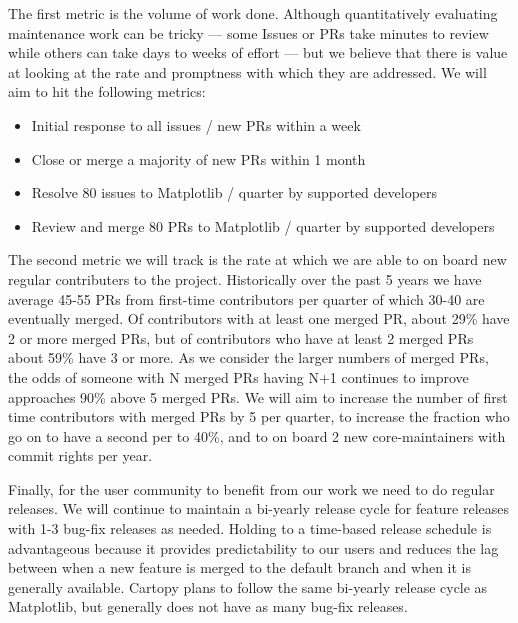 \documentclass[12pt]{article}
\numberwithin{page}{section}
\begin{document}
The first metric is the volume of work done.  Although quantitatively
evaluating maintenance work can be tricky --- some Issues or PRs take minutes
to review while others can take days to weeks of effort --- but we believe that
there is value at looking at the rate and promptness with which they are
addressed.  We will aim to hit the following metrics:
\begin{itemize}[noitemsep]
\item Initial response to all issues / new PRs within a week  %
\item Close or merge a majority of new PRs within 1 month     %
\item Resolve 80 issues to Matplotlib / quarter by supported developers       %
\item Review and merge 80 PRs to Matplotlib / quarter by supported developers %
\end{itemize}

The second metric we will track is the rate at which we are able to on board
new regular contributers to the project.  Historically over the past 5 years we
have average 45-55 PRs from first-time contributors per quarter of which 30-40
are eventually merged.  Of contributors with at least one merged PR, about 29\%
have 2 or more merged PRs, but of contributors who have at least 2 merged PRs
about 59\% have 3 or more.  As we consider the larger numbers of merged PRs,
the odds of someone with N merged PRs having N+1 continues to improve
approaches 90\% above 5 merged PRs.  We will aim to increase the number of
first time contributors with merged PRs by 5 per quarter, to increase the
fraction who go on to have a second per to 40\%, and to on board 2 new
core-maintainers with commit rights per year.

Finally, for the user community to benefit from our work we need to do
regular releases.  We will continue to maintain a bi-yearly release
cycle for feature releases with 1-3 bug-fix releases as needed.
Holding to a time-based release schedule is advantageous because it
provides predictability to our users and reduces the lag between when a
new feature is merged to the default branch and when it is generally
available. Cartopy plans to follow the same bi-yearly release cycle as Matplotlib, but
generally does not have as many bug-fix releases.
\end{document}
